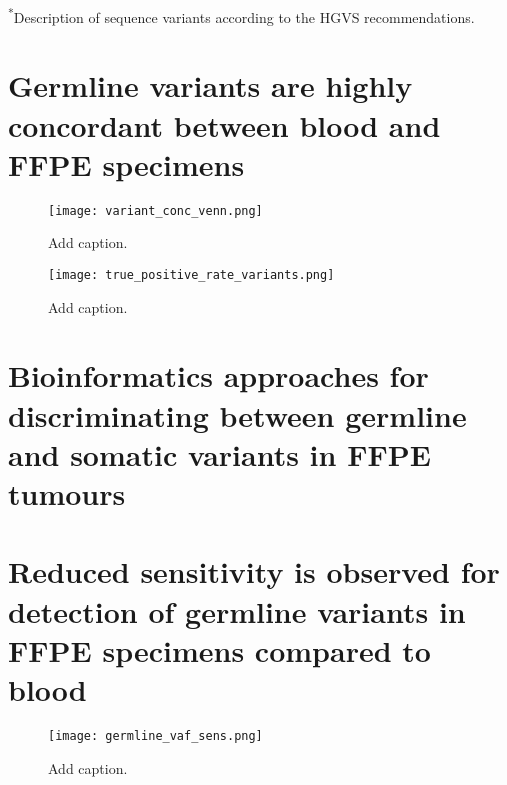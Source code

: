 \noindent\textsuperscript{*}Description of sequence variants according to the HGVS recommendations.


\section{Germline variants are highly concordant between blood and FFPE specimens}
\label{sec:GermlinevariantsarehighlyconcordantbetweenbloodandFFPEspecimens}



\begin{figure}[H]
\centering
	\texttt{[image: variant\_conc\_venn.png]}
	\caption{Add caption.}
	\label{fig:variant_conc_venn}
\end{figure}

\begin{figure}[H]
\centering
	\texttt{[image: true\_positive\_rate\_variants.png]}
	\caption{Add caption.}
	\label{fig:true_positive_rate_variants}
\end{figure}


\section{Bioinformatics approaches for discriminating between germline and somatic variants in FFPE tumours}
\label{sec:BioinformaticsapproachesfordiscriminatingbetweengermlineandsomaticstatusesofvariantsinFFPEtumours}


\section{Reduced sensitivity is observed for detection of germline variants in FFPE specimens compared to blood}
\label{sec:ReducedsensitivityisobservedfordetectionofgermlinevariantsinFFPEspecimenscomparedtoblood}

\begin{figure}[H]
	\texttt{[image: germline\_vaf\_sens.png]}
	\caption{Add caption.}
	\label{fig:germline_vaf_sens}
\end{figure}

